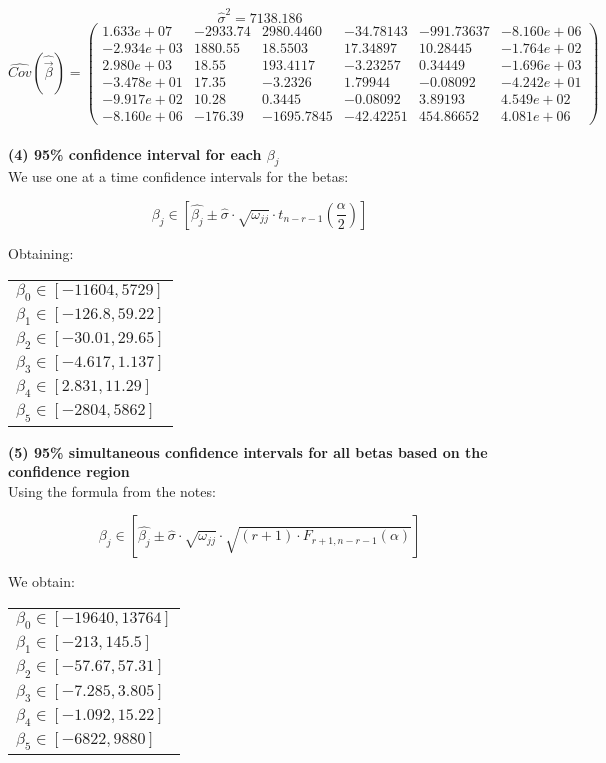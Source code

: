 \documentclass[11pt,a4paper]{article}
\begin{document}
	$$ \hat{\sigma}^2 = 7138.186 $$	
	$$ \hat{Cov}(\hat{\vec{\beta}}) = 
	\begin{pmatrix}
	1.633e+07  & -2933.74 & 2980.4460  & -34.78143 & -991.73637 & -8.160e+06 \\
	-2.934e+03 & 1880.55  & 18.5503    & 17.34897  & 10.28445   & -1.764e+02 \\
	2.980e+03  & 18.55    & 193.4117   & -3.23257  & 0.34449    & -1.696e+03 \\
	-3.478e+01 & 17.35    & -3.2326    & 1.79944   & -0.08092   & -4.242e+01 \\
	-9.917e+02 & 10.28    & 0.3445     & -0.08092  & 3.89193    & 4.549e+02  \\
	-8.160e+06 & -176.39  & -1695.7845 & -42.42251 & 454.86652  & 4.081e+06 
	\end{pmatrix}
	$$ \\
	
	\textbf{(4) 95\% confidence interval for each $\beta_j$} \\
	
	We use one at a time confidence intervals for the betas:
	
	$$ \beta_j \in [ \hat{\beta_j} \pm \hat{\sigma} \cdot \sqrt{\omega_{jj}} \cdot t_{n-r-1}(\frac{\alpha}{2}) ] $$
	
	Obtaining:
	
	\begin{table}[H] \centering
		\begin{tabular}{l}
			$\beta_0 \in [ -11604 , 5729 ]$ \\
			$\beta_1 \in [ -126.8 , 59.22 ]$ \\
			$\beta_2 \in [ -30.01 , 29.65 ]$ \\
			$\beta_3 \in [ -4.617 , 1.137 ]$ \\
			$\beta_4 \in [ 2.831 , 11.29 ]$ \\
			$\beta_5 \in [ -2804 , 5862 ]$
		\end{tabular}
	\end{table}
	
	\textbf{(5) 95\% simultaneous confidence intervals for all betas based on the confidence region} \\
	
	Using the formula from the notes:
	
	$$ \beta_j \in [ \hat{\beta_j} \pm \hat{\sigma} \cdot \sqrt{\omega_{jj}} \cdot \sqrt{(r+1) \cdot F_{r+1,n-r-1}(\alpha)} ] $$
	
	We obtain:
	
	\begin{table}[H] \centering
		\begin{tabular}{l}
			$\beta_0 \in [ -19640 , 13764 ]$ \\
			$\beta_1 \in [ -213 , 145.5 ]$ \\
			$\beta_2 \in [ -57.67 , 57.31 ]$ \\
			$\beta_3 \in [ -7.285 , 3.805 ]$ \\
			$\beta_4 \in [ -1.092 , 15.22 ]$ \\
			$\beta_5 \in [ -6822 , 9880 ]$
		\end{tabular}
	\end{table}
	
\end{document}
